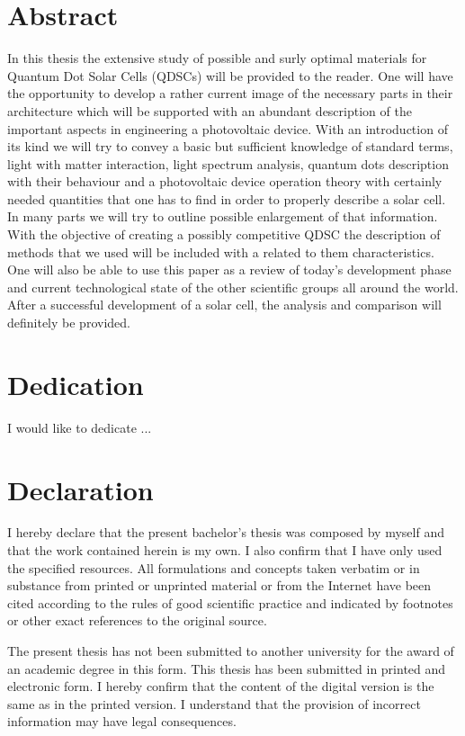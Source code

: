 \documentclass[12pt,twoside]{report}
\numberwithin{equation}{subsection}
\begin{document}
\graphicspath{ {images/} }


\chapter*{Abstract}
In this thesis the extensive study of possible and surly optimal materials for Quantum Dot Solar Cells (QDSCs) will be provided to the reader. One will have the opportunity to develop a rather current image of the necessary parts in their architecture which will be supported with an abundant description of the important aspects in engineering a photovoltaic device. With an introduction of its kind we will try to convey a basic but sufficient knowledge of standard terms, light with matter interaction, light spectrum analysis, quantum dots description with their behaviour and a photovoltaic device operation theory with certainly needed quantities that one has to find in order to properly describe a solar cell. In many parts we will try to outline possible enlargement of that information. With the objective of creating a possibly competitive QDSC the description of methods that we used will be included with a related to them characteristics. One will also be able to use this paper as a review of today’s development phase and current technological state of the other scientific groups all around the world.  After a successful development of a solar cell, the analysis and comparison will definitely be provided.
 
\chapter*{Dedication}
I would like to dedicate ...

\chapter*{Declaration}


I hereby declare that the present bachelor's thesis was composed
by myself and that the work contained herein is my own. I also confirm that I have only used the
specified resources. All formulations and concepts taken verbatim or in substance from printed
or unprinted material or from the Internet have been cited according to the rules of good
scientific practice and indicated by footnotes or other exact references to the original source.

\vline

\noindent The present thesis has not been submitted to another university for the award of an academic
degree in this form. This thesis has been submitted in printed and electronic form. I hereby
confirm that the content of the digital version is the same as in the printed version.
I understand that the provision of incorrect information may have legal consequences.
\vfill
\end{document}

